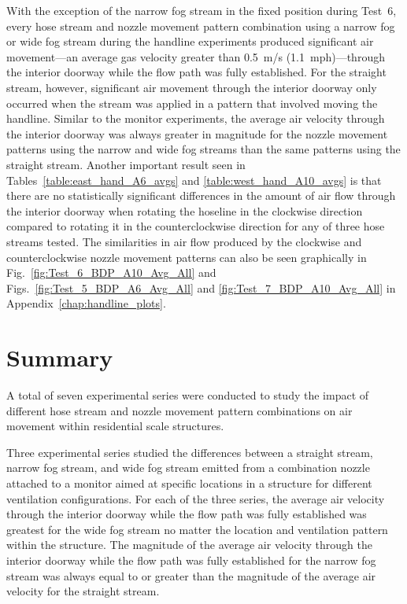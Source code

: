 \documentclass[12pt,oneside]{book}
\begin{document}
\FloatBarrier

With the exception of the narrow fog stream in the fixed position during Test~6, every hose stream and nozzle movement pattern combination using a narrow fog or wide fog stream during the handline experiments produced significant air movement---an average gas velocity greater than 0.5~m/s (1.1~mph)---through the interior doorway while the flow path was fully established. For the straight stream, however, significant air movement through the interior doorway only occurred when the stream was applied in a pattern that involved moving the handline. Similar to the monitor experiments, the average air velocity through the interior doorway was always greater in magnitude for the nozzle movement patterns using the narrow and wide fog streams than the same patterns using the straight stream. Another important result seen in Tables~\ref{table:east_hand_A6_avgs} and \ref{table:west_hand_A10_avgs} is that there are no statistically significant differences in the amount of air flow through the interior doorway when rotating the hoseline in the clockwise direction compared to rotating it in the counterclockwise direction for any of three hose streams tested. The similarities in air flow produced by the clockwise and counterclockwise nozzle movement patterns can also be seen graphically in Fig.~\ref{fig:Test_6_BDP_A10_Avg_All} and Figs.~\ref{fig:Test_5_BDP_A6_Avg_All} and \ref{fig:Test_7_BDP_A10_Avg_All} in Appendix~\ref{chap:handline_plots}. 


\chapter{Summary}
\label{chap:summary}

A total of seven experimental series were conducted to study the impact of different hose stream and nozzle movement pattern combinations on air movement within residential scale structures. 

Three experimental series studied the differences between a straight stream, narrow fog stream, and wide fog stream emitted from a combination nozzle attached to a monitor aimed at specific locations in a structure for different ventilation configurations. For each of the three series, the average air velocity through the interior doorway while the flow path was fully established was greatest for the wide fog stream no matter the location and ventilation pattern within the structure. The magnitude of the average air velocity through the interior doorway while the flow path was fully established for the narrow fog stream was always equal to or greater than the magnitude of the average air velocity for the straight stream. 
\end{document}
